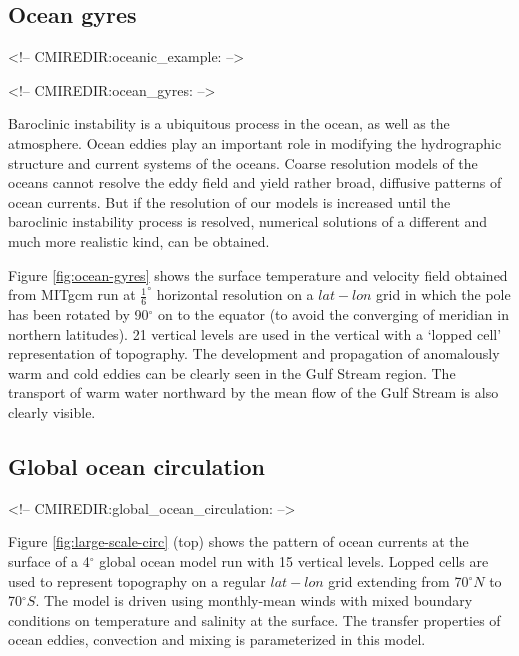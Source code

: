 

\subsection{Ocean gyres}
\begin{rawhtml}
<!-- CMIREDIR:oceanic_example: -->
\end{rawhtml}
\begin{rawhtml}
<!-- CMIREDIR:ocean_gyres: -->
\end{rawhtml}

Baroclinic instability is a ubiquitous process in the ocean, as well as the
atmosphere. Ocean eddies play an important role in modifying the
hydrographic structure and current systems of the oceans. Coarse resolution
models of the oceans cannot resolve the eddy field and yield rather broad,
diffusive patterns of ocean currents. But if the resolution of our models is
increased until the baroclinic instability process is resolved, numerical
solutions of a different and much more realistic kind, can be obtained.

Figure \ref{fig:ocean-gyres} shows the surface temperature and velocity 
field obtained from MITgcm run at $\frac{1}{6}^{\circ }$ horizontal 
resolution on a $lat-lon$
grid in which the pole has been rotated by 90$^{\circ }$ on to the equator
(to avoid the converging of meridian in northern latitudes). 21 vertical
levels are used in the vertical with a `lopped cell' representation of
topography. The development and propagation of anomalously warm and cold
eddies can be clearly seen in the Gulf Stream region. The transport of
warm water northward by the mean flow of the Gulf Stream is also clearly
visible.




\subsection{Global ocean circulation}
\begin{rawhtml}
<!-- CMIREDIR:global_ocean_circulation: -->
\end{rawhtml}

Figure \ref{fig:large-scale-circ} (top) shows the pattern of ocean currents at 
the surface of a 4$^{\circ }$
global ocean model run with 15 vertical levels. Lopped cells are used to
represent topography on a regular $lat-lon$ grid extending from 70$^{\circ
}N $ to 70$^{\circ }S$. The model is driven using monthly-mean winds with
mixed boundary conditions on temperature and salinity at the surface. The
transfer properties of ocean eddies, convection and mixing is parameterized
in this model.

